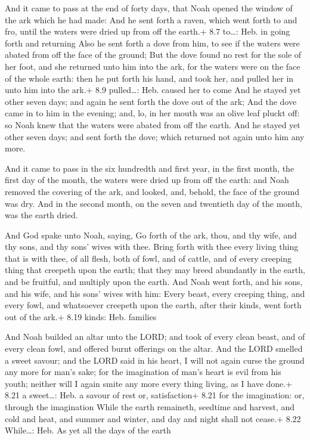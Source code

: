  And it came to pass at the end of forty days, that Noah
opened the window of the ark which he had made:  And he sent
forth a raven, which went forth to and fro, until the waters were dried
up from off the earth.+ 8.7 to\ldots: Heb. in going forth and returning
 Also he sent forth a dove from him, to see if the waters
were abated from off the face of the ground;  But the dove
found no rest for the sole of her foot, and she returned unto him into
the ark, for the waters were on the face of the whole earth: then he put
forth his hand, and took her, and pulled her in unto him into the ark.+
8.9 pulled\ldots: Heb. caused her to come  And he stayed
yet other seven days; and again he sent forth the dove out of the ark;
 And the dove came in to him in the evening; and, lo, in
her mouth was an olive leaf pluckt off: so Noah knew that the waters
were abated from off the earth.  And he stayed yet other
seven days; and sent forth the dove; which returned not again unto him
any more.

 And it came to pass in the six hundredth and first year,
in the first month, the first day of the month, the waters were dried up
from off the earth: and Noah removed the covering of the ark, and
looked, and, behold, the face of the ground was dry.  And
in the second month, on the seven and twentieth day of the month, was
the earth dried.

 And God spake unto Noah, saying,  Go forth
of the ark, thou, and thy wife, and thy sons, and thy sons' wives with
thee.  Bring forth with thee every living thing that is
with thee, of all flesh, both of fowl, and of cattle, and of every
creeping thing that creepeth upon the earth; that they may breed
abundantly in the earth, and be fruitful, and multiply upon the earth.
 And Noah went forth, and his sons, and his wife, and his
sons' wives with him:  Every beast, every creeping thing,
and every fowl, and whatsoever creepeth upon the earth, after their
kinds, went forth out of the ark.+ 8.19 kinds: Heb. families

 And Noah builded an altar unto the LORD; and took of
every clean beast, and of every clean fowl, and offered burnt offerings
on the altar.  And the LORD smelled a sweet savour; and the
LORD said in his heart, I will not again curse the ground any more for
man's sake; for the imagination of man's heart is evil from his youth;
neither will I again smite any more every thing living, as I have done.+
8.21 a sweet\ldots: Heb. a savour of rest or, satisfaction+ 8.21 for the
imagination: or, through the imagination  While the earth
remaineth, seedtime and harvest, and cold and heat, and summer and
winter, and day and night shall not cease.+ 8.22 While\ldots: Heb. As
yet all the days of the earth

